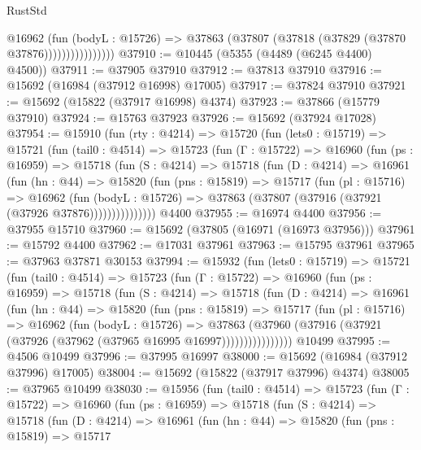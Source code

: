 \begin{lexlean}{RustStd}
\begin{coremodule}
                        @16962
                          (fun (bodyL : @15726) =>
                          @37863 (@37807 (@37818 (@37829 (@37870 @37876))))))))))))))))
@37910 := @10445 (@5355 (@4489 (@6245 @4400) @4500))
@37911 := @37905 @37910
@37912 := @37813 @37910
@37916 := @15692 (@16984 (@37912 @16998) @17005)
@37917 := @37824 @37910
@37921 := @15692 (@15822 (@37917 @16998) @4374)
@37923 := @37866 (@15779 @37910)
@37924 := @15763 @37923
@37926 := @15692 (@37924 @17028)
@37954 := @15910
    (fun (rty : @4214) =>
    @15720
      (fun (lets0 : @15719) =>
      @15721
        (fun (tail0 : @4514) =>
        @15723
          (fun (Γ : @15722) =>
          @16960
            (fun (ps : @16959) =>
            @15718
              (fun (S : @4214) =>
              @15718
                (fun (D : @4214) =>
                @16961
                  (fun (hn : @44) =>
                  @15820
                    (fun (pns : @15819) =>
                    @15717
                      (fun (pl : @15716) =>
                      @16962
                        (fun (bodyL : @15726) =>
                        @37863 (@37807 (@37916 (@37921 (@37926 @37876)))))))))))))))
    @4400
@37955 := @16974 @4400
@37956 := @37955 @15710
@37960 := @15692 (@37805 (@16971 (@16973 @37956)))
@37961 := @15792 @4400
@37962 := @17031 @37961
@37963 := @15795 @37961
@37965 := @37963 @37871 @30153
@37994 := @15932
    (fun (lets0 : @15719) =>
    @15721
      (fun (tail0 : @4514) =>
      @15723
        (fun (Γ : @15722) =>
        @16960
          (fun (ps : @16959) =>
          @15718
            (fun (S : @4214) =>
            @15718
              (fun (D : @4214) =>
              @16961
                (fun (hn : @44) =>
                @15820
                  (fun (pns : @15819) =>
                  @15717
                    (fun (pl : @15716) =>
                    @16962
                      (fun (bodyL : @15726) =>
                      @37863
                        (@37960
                          (@37916 (@37921 (@37926 (@37962 (@37965 @16995 @16997))))))))))))))))
    @10499
@37995 := @4506 @10499
@37996 := @37995 @16997
@38000 := @15692 (@16984 (@37912 @37996) @17005)
@38004 := @15692 (@15822 (@37917 @37996) @4374)
@38005 := @37965 @10499
@38030 := @15956
    (fun (tail0 : @4514) =>
    @15723
      (fun (Γ : @15722) =>
      @16960
        (fun (ps : @16959) =>
        @15718
          (fun (S : @4214) =>
          @15718
            (fun (D : @4214) =>
            @16961
              (fun (hn : @44) =>
              @15820
                (fun (pns : @15819) =>
                @15717

\end{coremodule}
\end{lexlean}

